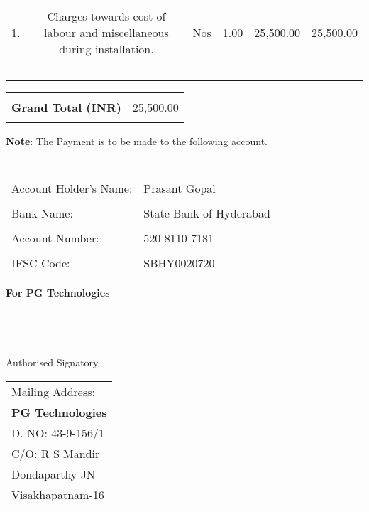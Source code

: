 \documentclass[11pt,A4]{article}
\begin{document}
{{\begin{center}
\begin{tabular}{|c|c|c|c|c|c|}
  1.  &   \parbox{3.2in}{\footnotesize  Charges towards cost of labour and miscellaneous during
installation. }

 &   Nos & 1.00 & 25,500.00 & 25,500.00 \\

                                    
\ & & &  & &  \\
\hline

                                    
\end{tabular}
\end{center}
}


\hspace*{11.70cm}
\begin{tabular}{|c|r|}
\hline
& \\
{\bf Grand Total (INR)} & 25,500.00 \\
& \\
\hline
\end{tabular}

\vspace*{-1cm}
\noindent \hspace*{6mm} {\bf Note}: The Payment is to be made to the following account. \\ \\
\hspace*{1cm}\begin{tabular}{|l|l|}
\hline
& \\
{ Account Holder's Name}: & Prasant Gopal \\
\hline
& \\
{ Bank Name:} & State Bank of Hyderabad\\
\hline
& \\
{ Account Number}: & 520-8110-7181 \\
\hline
& \\
{ IFSC Code:} & SBHY0020720 \\
\hline
\end{tabular}}
\vspace*{65pt}


{\bf For  PG Technologies } \\ \\ \\ \\ \\
 \hspace*{0.6cm}Authorised Signatory
\vspace*{-72pt}
\begin{flushright}
\begin{tabular}{l}
Mailing Address:\\
{\bf PG Technologies}\\
D. NO: 43-9-156/1\\
C/O: R S Mandir\\
Dondaparthy JN\\ 
Visakhapatnam-16\\
\end{tabular}
\end{flushright}
\end{document}
